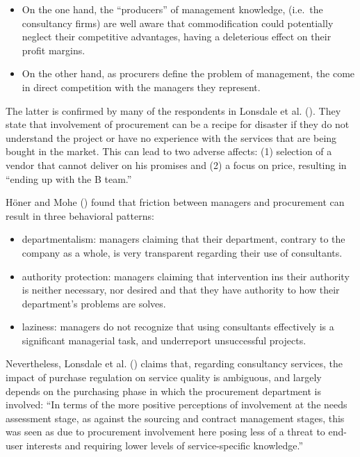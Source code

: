 \documentclass[
  man,floatsintext]{apa6}
\begin{document}
\begin{itemize}
\item
  On the one hand, the ``producers'' of management knowledge, (i.e.~the consultancy firms) are well aware that commodification could potentially neglect their competitive advantages, having a deleterious effect on their profit margins.
\item
  On the other hand, as procurers define the problem of management, the come in direct competition with the managers they represent.
\end{itemize}

The latter is confirmed by many of the respondents in Lonsdale et al. (). They state that involvement of procurement can be a recipe for disaster if they do not understand the project or have no experience with the services that are being bought in the market. This can lead to two adverse affects: (1) selection of a vendor that cannot deliver on his promises and (2) a focus on price, resulting in ``ending up with the B team.''

Höner and Mohe () found that friction between managers and procurement can result in three behavioral patterns:

\begin{itemize}
\item
  departmentalism: managers claiming that their department, contrary to the company as a whole, is very transparent regarding their use of consultants.
\item
  authority protection: managers claiming that intervention ins their authority is neither necessary, nor desired and that they have authority to how their department's problems are solves.
\item
  laziness: managers do not recognize that using consultants effectively is a significant managerial task, and underreport unsuccessful projects.
\end{itemize}

Nevertheless, Lonsdale et al. () claims that, regarding consultancy services, the impact of purchase regulation on service quality is ambiguous, and largely depends on the purchasing phase in which the procurement department is involved: ``In terms of the more positive perceptions of involvement at the needs assessment stage, as against the sourcing and contract management stages, this was seen as due to procurement involvement here posing less of a threat to end-user interests and requiring lower levels of service-specific knowledge.''
\end{document}
